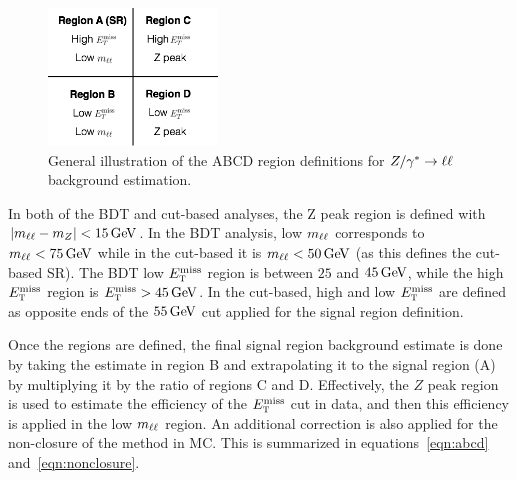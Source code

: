 
\begin{figure}[h!]
  \centering
  \captionsetup{justification=centering}
  \includegraphics[width=0.4\textwidth]{figures/ABCD}
  \caption{General illustration of the ABCD region definitions for $Z/\gamma^{\ast}\to\ell\ell$ background estimation.}
  \label{fig:ABCDcuts}
\end{figure}

In both of the BDT and cut-based analyses, the Z peak region is defined with $|\mll - m_Z| < 15 \GeV$. In the BDT analysis, low $m_{\ell\ell}$ corresponds to $\mll < 75 \GeV$ while in the cut-based it is $\mll < 50 \GeV$ (as this defines the cut-based SR). The BDT low $E_{\textrm{\footnotesize\sc t}}^{\rm miss}$ region is between $25$ and $45 \GeV$, while the high $E_{\textrm{\footnotesize\sc t}}^{\rm miss}$ region is $\MET > 45 \GeV$. In the cut-based, high and low $E_{\textrm{\footnotesize\sc t}}^{\rm miss}$ are defined as opposite ends of the $55 \GeV$ cut applied for the signal region definition.

Once the regions are defined, the final signal region background estimate is done by taking the estimate in region B and extrapolating it to the signal region (A) by multiplying it by the ratio of regions C and D. Effectively, the $Z$ peak region is used to estimate the efficiency of the $E_{\textrm{\footnotesize\sc t}}^{\rm miss}$ cut in data, and then this efficiency is applied in the low $m_{\ell\ell}$ region. An additional correction is also applied for the non-closure of the method in MC. This is summarized in equations~\ref{eqn:abcd} and~\ref{eqn:nonclosure}.

